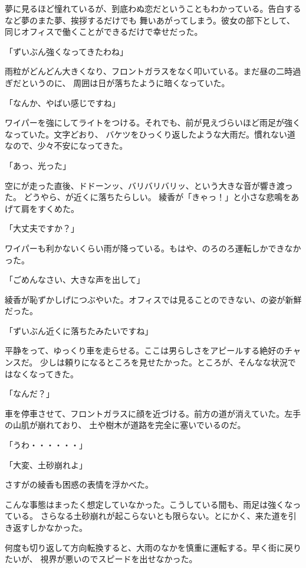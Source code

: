 ﻿\documentclass[book,tate]{jlreq}
\begin{document}
夢に見るほど憧れているが、到底わぬ恋だということもわかっている。告白するなど夢のまた夢、挨拶するだけでも
舞いあがってしまう。彼女の部下として、同じオフィスで働くことができるだけで幸せだった。

「ずいぶん強くなってきたわね」

雨粒がどんどん大きくなり、フロントガラスをなく叩いている。まだ昼の二時過ぎだというのに、
周囲は日が落ちたように暗くなっていた。

「なんか、やばい感じですね」

ワイパーを強にしてライトをつける。それでも、前が見えづらいほど雨足が強くなっていた。文字どおり、
バケツをひっくり返したような大雨だ。慣れない道なので、少々不安になってきた。

「あっ、光った」

空にが走った直後、ドドーンッ、バリバリバリッ、という大きな音が響き渡った。
どうやら、が近くに落ちたらしい。
綾香が「きゃっ！」と小さな悲鳴をあげて肩をすくめた。

「大丈夫ですか？」

ワイパーも利かないくらい雨が降っている。もはや、のろのろ運転しかできなかった。

「ごめんなさい、大きな声を出して」

綾香が恥ずかしげにつぶやいた。オフィスでは見ることのできない、の姿が新鮮だった。

「ずいぶん近くに落ちたみたいですね」

平静をって、ゆっくり車を走らせる。ここは男らしさをアピールする絶好のチャンスだ。
少しは頼りになるところを見せたかった。ところが、そんなな状況ではなくなってきた。

「なんだ？」

車を停車させて、フロントガラスに顔を近づける。前方の道が消えていた。左手の山肌が崩れており、
土や樹木が道路を完全に塞いでいるのだ。

「うわ・・・・・・」

「大変、土砂崩れよ」

さすがの綾香も困惑の表情を浮かべた。

こんな事態はまったく想定していなかった。こうしている間も、雨足は強くなっている。
さらなる土砂崩れが起こらないとも限らない。とにかく、来た道を引き返すしかなかった。

何度も切り返して方向転換すると、大雨のなかを慎重に運転する。早く街に戻りたいが、
視界が悪いのでスピードを出せなかった。
\end{document}
